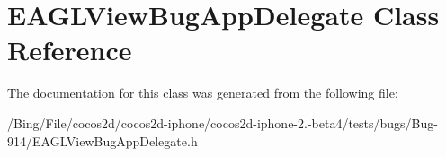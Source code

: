 \hypertarget{interface_e_a_g_l_view_bug_app_delegate}{\section{E\-A\-G\-L\-View\-Bug\-App\-Delegate Class Reference}
\label{interface_e_a_g_l_view_bug_app_delegate}
}


The documentation for this class was generated from the following file\-:\begin{DoxyCompactItemize}
\item 
/\-Bing/\-File/cocos2d/cocos2d-\/iphone/cocos2d-\/iphone-\/2.-\/beta4/tests/bugs/\-Bug-\/914/E\-A\-G\-L\-View\-Bug\-App\-Delegate.\-h\end{DoxyCompactItemize}
